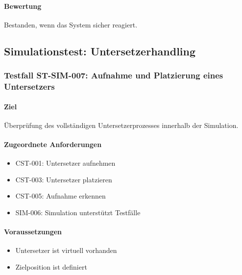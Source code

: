 \documentclass[
  a4paper,
  12pt,
  DIV=12,        %
  parskip=half,  %
  headings=small %
]{scrartcl}
\theoremstyle{definition}
\providecommand{\tightlist}{%
  \setlength{\itemsep}{0pt}\setlength{\parskip}{0pt}}
\theoremstyle{definition}
\begin{document}
\paragraph{Bewertung}\label{bewertung-21}

Bestanden, wenn das System sicher reagiert.

\subsection{Simulationstest:
Untersetzerhandling}\label{simulationstest-untersetzerhandling}

\subsubsection{Testfall ST-SIM-007: Aufnahme und Platzierung eines
Untersetzers}\label{testfall-st-sim-007-aufnahme-und-platzierung-eines-untersetzers}

\paragraph{Ziel}\label{ziel-22}

Überprüfung des vollständigen Untersetzerprozesses innerhalb der
Simulation.

\paragraph{Zugeordnete
Anforderungen}\label{zugeordnete-anforderungen-22}

\begin{itemize}
\tightlist
\item
  CST-001: Untersetzer aufnehmen
\item
  CST-003: Untersetzer platzieren
\item
  CST-005: Aufnahme erkennen
\item
  SIM-006: Simulation unterstützt Testfälle
\end{itemize}

\paragraph{Voraussetzungen}\label{voraussetzungen-22}

\begin{itemize}
\tightlist
\item
  Untersetzer ist virtuell vorhanden
\item
  Zielposition ist definiert
\end{itemize}
\end{document}
